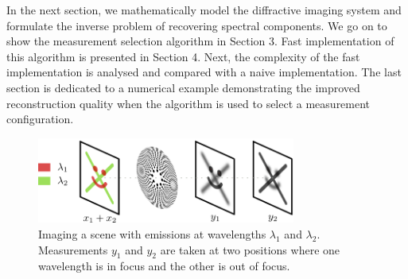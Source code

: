 \documentclass{article}
\begin{document}
In the next section, we mathematically model the diffractive imaging system and
formulate the inverse problem of recovering spectral components. We go on to
show the measurement selection algorithm in Section 3. Fast implementation of
this algorithm is presented in Section 4. Next, the complexity of the fast
implementation is analysed and compared with a naive implementation. The last
section is dedicated to a numerical example demonstrating the improved
reconstruction quality when the algorithm is used to select a measurement
configuration.





\begin{figure}[htb]
  \begin{minipage}[b]{1\linewidth}
    \centering
    \centerline{\includegraphics[width=8.5cm]{diffraction_system}}
  \end{minipage}
  \caption{Imaging a scene with emissions at wavelengths $\lambda_1$ and
  $\lambda_2$. Measurements $y_1$ and $y_2$ are taken at two positions where one wavelength
  is in focus and the other is out of focus.}
  \label{fig:pssi_drawing}
\end{figure}
\end{document}
